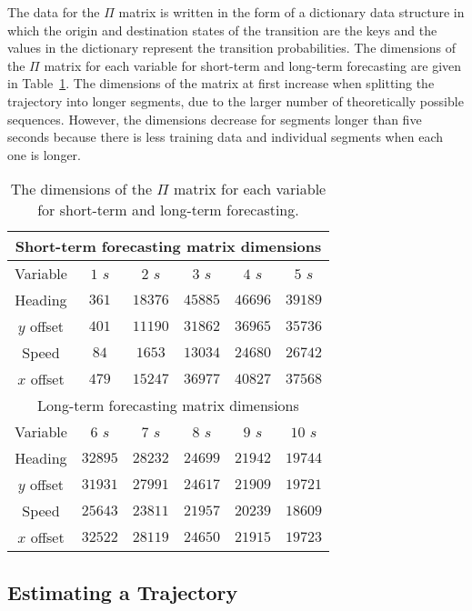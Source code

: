 \documentclass[preprint,12pt]{elsarticle}
\begin{document}
The data for the $\Pi$ matrix is written in the form of a dictionary data structure in which the origin and destination states of the transition are the keys and the values in the dictionary represent the transition probabilities. The dimensions of the $\Pi$ matrix for each variable for short-term and long-term forecasting are given in Table~\ref{tab:dimmatr}. The dimensions of the matrix at first increase when splitting the trajectory into longer segments, due to the larger number of theoretically possible sequences. However, the dimensions decrease for segments longer than five seconds because there is less training data and individual segments when each one is longer.
 
\begin{table}[!ht]
	\centering
	\begin{tabular}{|c|c|c|c|c|c|}
		\hline
		\multicolumn{6}{|c|}{Short-term forecasting matrix dimensions} \\ \hline
		Variable & $1$ $s$ & $2$ $s$ & $3$ $s$ & $4$ $s$ & $5$ $s$ \\ \hline
        Heading & $361$ & $18376$ & $45885$ & $46696$ & $39189$ \\ \hline
        $y$ offset & $401$ & $11190$ & $31862$ & $36965$ & $35736$ \\ \hline
        Speed & $84$ & $1653$ & $13034$ & $24680$ & $26742$ \\ \hline
        $x$ offset & $479$ & $15247$ & $36977$ & $40827$ & $37568$ \\ \hline
		\multicolumn{6}{|c|}{Long-term forecasting matrix dimensions} \\ \hline
		Variable & $6$ $s$ & $7$ $s$ & $8$ $s$ & $9$ $s$ & $10$ $s$ \\ \hline
        Heading & $32895$ & $28232$ & $24699$ & $21942$ & $19744$ \\ \hline
        $y$ offset & $31931$ & $27991$ & $24617$ & $21909$ & $19721$ \\ \hline
        Speed & $25643$ & $23811$ & $21957$ & $20239$ & $18609$ \\ \hline
        $x$ offset & $32522$ & $28119$ & $24650$ & $21915$ & $19723$ \\ \hline
	\end{tabular}
	\caption{The dimensions of the $\Pi$ matrix for each variable for short-term and long-term forecasting.}
	\label{tab:dimmatr}
\end{table}


  
\subsection{Estimating a Trajectory}
\end{document}

